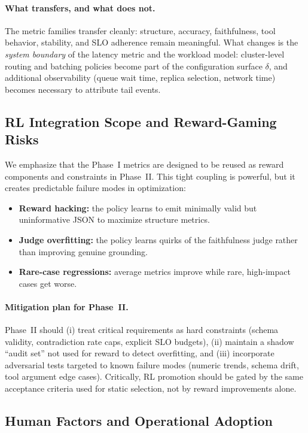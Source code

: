 \documentclass[11pt]{article}
\begin{document}
\paragraph{What transfers, and what does not.}
The metric families transfer cleanly: structure, accuracy, faithfulness, tool behavior, stability, and SLO adherence remain meaningful.
What changes is the \emph{system boundary} of the latency metric and the workload model: cluster-level routing and batching policies become part of the configuration surface $\delta$, and additional observability (queue wait time, replica selection, network time) becomes necessary to attribute tail events.

\subsection{RL Integration Scope and Reward-Gaming Risks}

We emphasize that the Phase~I metrics are designed to be reused as reward components and constraints in Phase~II.
This tight coupling is powerful, but it creates predictable failure modes in optimization:

\begin{itemize}[leftmargin=12pt]
    \item \textbf{Reward hacking:} the policy learns to emit minimally valid but uninformative JSON to maximize structure metrics.
    \item \textbf{Judge overfitting:} the policy learns quirks of the faithfulness judge rather than improving genuine grounding.
    \item \textbf{Rare-case regressions:} average metrics improve while rare, high-impact cases get worse.
\end{itemize}

\paragraph{Mitigation plan for Phase~II.}
Phase~II should (i) treat critical requirements as hard constraints (schema validity, contradiction rate caps, explicit SLO budgets), (ii) maintain a shadow ``audit set'' not used for reward to detect overfitting, and (iii) incorporate adversarial tests targeted to known failure modes (numeric trends, schema drift, tool argument edge cases).
Critically, RL promotion should be gated by the same acceptance criteria used for static selection, not by reward improvements alone.

\subsection{Human Factors and Operational Adoption}
\end{document}
